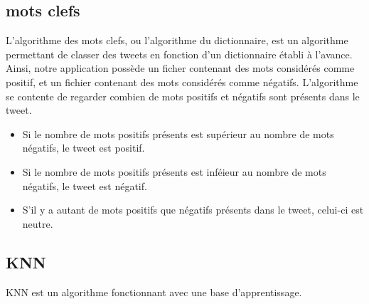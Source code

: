 \documentclass[a4paper,10pt]{report}
\begin{document}
    \subsection{mots clefs}
      L'algorithme des mots clefs, ou l'algorithme du dictionnaire, est un algorithme permettant de classer des tweets en fonction d'un dictionnaire établi à l'avance.
      Ainsi, notre application possède un ficher contenant des mots considérés comme positif, et un fichier contenant des mots considérés comme négatifs.
      L'algorithme se contente de regarder combien de mots positifs et négatifs sont présents dans le tweet.
      \begin{itemize}
       \item Si le nombre de mots positifs présents est supérieur au nombre de mots négatifs, le tweet est positif.
       \item Si le nombre de mots positifs présents est inféieur au nombre de mots négatifs, le tweet est négatif.
       \item S'il y a autant de mots positifs que négatifs présents dans le tweet, celui-ci est neutre.
      \end{itemize}

    \subsection{KNN}
      KNN est un algorithme fonctionnant avec une base d'apprentissage.
      
\end{document}
